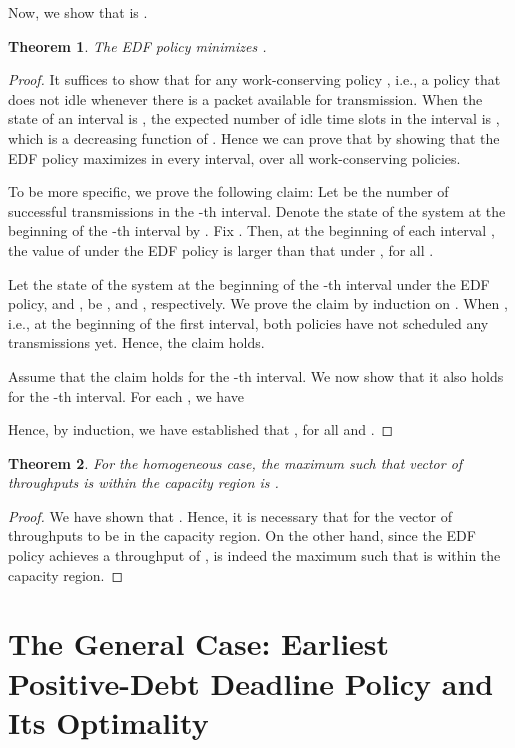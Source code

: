 \documentclass[10pt,nocopyrightspace]{sigplan-proc-varsize-1in}
\newtheorem{theorem}{Theorem}
\begin{document}
Now, we show that  is .
\begin{theorem}	\label{theorem:feasibility:EDF}
The EDF policy minimizes .
\end{theorem}
\begin{proof}
It suffices to show that  for any work-conserving policy , i.e., a policy that does not idle whenever there is a packet available for transmission. When the state of an interval is , the expected number of idle time slots in the interval is , which is a decreasing function of . Hence we can prove that  by showing that the EDF policy maximizes  in every interval, over all work-conserving policies.

To be more specific, we prove the following claim: Let  be the number of successful transmissions in the -th interval. Denote the state of the system at the beginning of the -th interval by . Fix . Then, at the beginning of each interval , the value of  under the EDF policy is larger than that under , for all .

Let the state of the system at the beginning of the -th interval under the EDF policy, and , be , and , respectively. We prove the claim by induction on . When , i.e., at the beginning of the first interval, both policies have not scheduled any transmissions yet. Hence, the claim holds.

Assume that the claim holds for the -th interval. We now show that it also holds for the -th interval. For each , we have

Hence, by induction, we have established that , for all  and .
\end{proof}


\begin{theorem}\label{t1}
For the homogeneous case, the maximum  such that vector of throughputs  is within the capacity region is .
\end{theorem}
\begin{proof}
We have shown that . Hence, it is necessary that  for the vector of throughputs  to be in the capacity region. On the other hand, since the EDF policy achieves a throughput of ,  is indeed the maximum  such that  is within the capacity region.
\end{proof}




\section{The General Case: Earliest Positive-Debt Deadline Policy and Its Optimality}   \label{section:scheduling}
\end{document}
